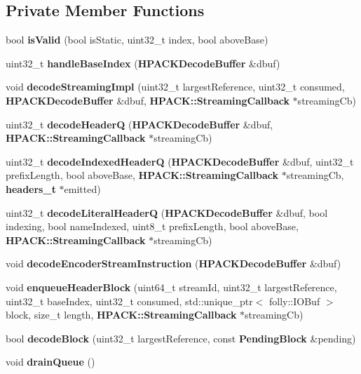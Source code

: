 \subsection*{Private Member Functions}
\begin{DoxyCompactItemize}
\item 
bool {\bf is\+Valid} (bool is\+Static, uint32\+\_\+t index, bool above\+Base)
\item 
uint32\+\_\+t {\bf handle\+Base\+Index} ({\bf H\+P\+A\+C\+K\+Decode\+Buffer} \&dbuf)
\item 
void {\bf decode\+Streaming\+Impl} (uint32\+\_\+t largest\+Reference, uint32\+\_\+t consumed, {\bf H\+P\+A\+C\+K\+Decode\+Buffer} \&dbuf, {\bf H\+P\+A\+C\+K\+::\+Streaming\+Callback} $\ast$streaming\+Cb)
\item 
uint32\+\_\+t {\bf decode\+HeaderQ} ({\bf H\+P\+A\+C\+K\+Decode\+Buffer} \&dbuf, {\bf H\+P\+A\+C\+K\+::\+Streaming\+Callback} $\ast$streaming\+Cb)
\item 
uint32\+\_\+t {\bf decode\+Indexed\+HeaderQ} ({\bf H\+P\+A\+C\+K\+Decode\+Buffer} \&dbuf, uint32\+\_\+t prefix\+Length, bool above\+Base, {\bf H\+P\+A\+C\+K\+::\+Streaming\+Callback} $\ast$streaming\+Cb, {\bf headers\+\_\+t} $\ast$emitted)
\item 
uint32\+\_\+t {\bf decode\+Literal\+HeaderQ} ({\bf H\+P\+A\+C\+K\+Decode\+Buffer} \&dbuf, bool indexing, bool name\+Indexed, uint8\+\_\+t prefix\+Length, bool above\+Base, {\bf H\+P\+A\+C\+K\+::\+Streaming\+Callback} $\ast$streaming\+Cb)
\item 
void {\bf decode\+Encoder\+Stream\+Instruction} ({\bf H\+P\+A\+C\+K\+Decode\+Buffer} \&dbuf)
\item 
void {\bf enqueue\+Header\+Block} (uint64\+\_\+t stream\+Id, uint32\+\_\+t largest\+Reference, uint32\+\_\+t base\+Index, uint32\+\_\+t consumed, std\+::unique\+\_\+ptr$<$ folly\+::\+I\+O\+Buf $>$ block, size\+\_\+t length, {\bf H\+P\+A\+C\+K\+::\+Streaming\+Callback} $\ast$streaming\+Cb)
\item 
bool {\bf decode\+Block} (uint32\+\_\+t largest\+Reference, const {\bf Pending\+Block} \&pending)
\item 
void {\bf drain\+Queue} ()
\end{DoxyCompactItemize}
